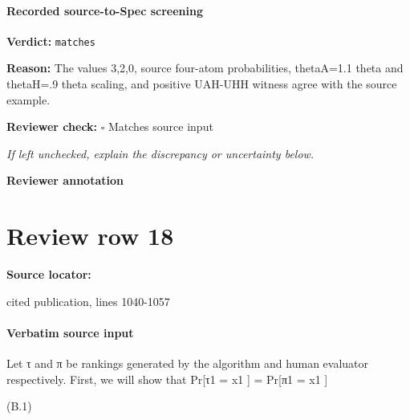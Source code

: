\documentclass[10pt]{article}
\newcommand{\reviewerbox}{%
  \par\noindent\fbox{\parbox{0.96\linewidth}{\rule{0pt}{0.38in}}}\par
}
\newcommand{\reviewmatch}[1]{%
  \par\noindent\textbf{Reviewer check:} $\square$\; #1\par
  \noindent\emph{If left unchecked, explain the discrepancy or uncertainty below.}\par
}
\begin{document}
\paragraph{Recorded source-to-Spec screening}
\textbf{Verdict:} \texttt{matches}
\\
{\raggedright
\textbf{Reason:} The values 3,2,0, source four-\allowbreak{}atom probabilities, thetaA=1.\allowbreak{}1 theta and thetaH=.\allowbreak{}9 theta scaling, and positive UAH-\allowbreak{}UHH witness agree with the source example.\allowbreak{}
\par}
\reviewmatch{Matches source input}
\noindent\textbf{Reviewer annotation}\par
\reviewerbox
\clearpage
\hypertarget{source-claim-36e8cf848060682f}{}
\section*{Review row 18}
\textbf{Source locator:} {\footnotesize\raggedright cited publication, lines 1040-\allowbreak{}1057\par}
\paragraph{Verbatim source input}
\begin{ReviewVerbatim}
Let τ and π be rankings generated by the algorithm and human evaluator respectively. First, we will
show that
Pr[τ1 = x1 ] = Pr[π1 = x1 ]

(B.1)
\end{ReviewVerbatim}
\end{document}
